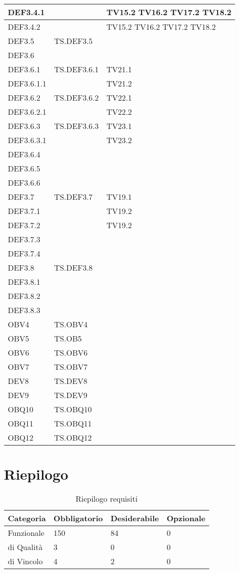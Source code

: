 \documentclass{scalatekids-article}
\begin{document}
\begin{longtable}[H]{|l|p{4cm}|p{4cm}|}
\hline
DEF3.4.1 & & TV15.2 TV16.2 TV17.2 TV18.2\\
\hline
DEF3.4.2 & & TV15.2 TV16.2 TV17.2 TV18.2\\
\hline
DEF3.5 & TS.DEF3.5 & \\
\hline
DEF3.6 & & \\
\hline
DEF3.6.1 & TS.DEF3.6.1 & TV21.1\\
\hline
DEF3.6.1.1 & & TV21.2\\
\hline
DEF3.6.2 & TS.DEF3.6.2 & TV22.1\\
\hline
DEF3.6.2.1 & & TV22.2\\
\hline
DEF3.6.3 & TS.DEF3.6.3 & TV23.1\\
\hline
DEF3.6.3.1 & & TV23.2\\
\hline
DEF3.6.4 & & \\ %
\hline
DEF3.6.5 & & \\ %
\hline
DEF3.6.6 & & \\ %
\hline
DEF3.7 & TS.DEF3.7 & TV19.1\\
\hline
DEF3.7.1 & & TV19.2\\
\hline
DEF3.7.2 & & TV19.2\\
\hline
DEF3.7.3 & & \\
\hline
DEF3.7.4 & & \\
\hline
DEF3.8 & TS.DEF3.8 & \\
\hline
DEF3.8.1 & & \\
\hline
DEF3.8.2 & & \\
\hline
DEF3.8.3 & & \\
\hline
OBV4 & TS.OBV4 & \\
\hline
OBV5 & TS.OB5 & \\
\hline
OBV6 & TS.OBV6 & \\
\hline
OBV7 & TS.OBV7 & \\
\hline
DEV8 & TS.DEV8 & \\
\hline
DEV9 & TS.DEV9 & \\
\hline
OBQ10 & TS.OBQ10 & \\
\hline
OBQ11 & TS.OBQ11 & \\
\hline
OBQ12 & TS.OBQ12 & \\
\hline
\end{longtable}

\section{Riepilogo}

\begin{table}[H]
  \centering
  \caption{Riepilogo requisiti}
  \begin{tabular}{|l|l|l|l|}
    \hline
    Categoria & Obbligatorio & Desiderabile & Opzionale\\
    \hline
    Funzionale & 150 & 84 & 0 \\
    \hline
    di Qualità & 3 & 0 & 0 \\
    \hline
    di Vincolo & 4 & 2 & 0 \\
    \hline
  \end{tabular}
\end{table}
\newpage
\appendix
\listoftables
\listoffigures
\end{document}
